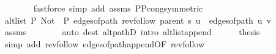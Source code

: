 \begin{isabellebody}
\ \ \ \ \ \ \isamarkupfalse%
\ {\isacharparenleft}{\kern0pt}fastforce\ simp\ add{\isacharcolon}{\kern0pt}\ assms{\isacharparenleft}{\kern0pt}{}{\isacharparenright}{\kern0pt}\ P{\isacharunderscore}{\kern0pt}P{\isacharprime}{\kern0pt}{\isacharprime}{\kern0pt}{\isacharunderscore}{\kern0pt}cong{\isacharbrackleft}{\kern0pt}symmetric{\isacharbrackright}{\kern0pt}{\isacharparenright}{\kern0pt}\isanewline
\ \ \ \ \isamarkupfalse%
\ \isamarkupfalse%
\ {\isachardoublequoteopen}alt{\isacharunderscore}{\kern0pt}list\ P{\isacharprime}{\kern0pt}{\isacharprime}{\kern0pt}\ {\isacharparenleft}{\kern0pt}Not\ {\isasymcirc}\ P{\isacharprime}{\kern0pt}{\isacharprime}{\kern0pt}{\isacharparenright}{\kern0pt}\ {\isacharparenleft}{\kern0pt}edges{\isacharunderscore}{\kern0pt}of{\isacharunderscore}{\kern0pt}path\ {\isacharparenleft}{\kern0pt}rev{\isacharunderscore}{\kern0pt}follow\ {\isacharparenleft}{\kern0pt}parent\ s{\isacharparenright}{\kern0pt}\ u{\isacharparenright}{\kern0pt}\ {\isacharat}{\kern0pt}\ edges{\isacharunderscore}{\kern0pt}of{\isacharunderscore}{\kern0pt}path\ {\isacharbrackleft}{\kern0pt}u{\isacharcomma}{\kern0pt}\ v{\isacharbrackright}{\kern0pt}{\isacharparenright}{\kern0pt}{\isachardoublequoteclose}\isanewline
\ \ \ \ \ \ \isamarkupfalse%
\ assms{\isacharparenleft}{\kern0pt}{}{\isacharparenright}{\kern0pt}\isanewline
\ \ \ \ \ \ \isamarkupfalse%
\ {\isacharparenleft}{\kern0pt}auto\ dest{\isacharcolon}{\kern0pt}\ alt{\isacharunderscore}{\kern0pt}pathD{\isacharparenleft}{\kern0pt}{}{\isacharparenright}{\kern0pt}\ intro{\isacharcolon}{\kern0pt}\ alt{\isacharunderscore}{\kern0pt}list{\isacharunderscore}{\kern0pt}append{\isacharunderscore}{\kern0pt}{}{\isacharprime}{\kern0pt}{\isacharparenright}{\kern0pt}\isanewline
\ \ \ \ \isamarkupfalse%
\ {\isacharquery}{\kern0pt}thesis\isanewline
\ \ \ \ \ \ \isamarkupfalse%
\ {\isacharparenleft}{\kern0pt}simp\ add{\isacharcolon}{\kern0pt}\ rev{\isacharunderscore}{\kern0pt}follow{\isacharparenleft}{\kern0pt}{}{\isacharparenright}{\kern0pt}\ edges{\isacharunderscore}{\kern0pt}of{\isacharunderscore}{\kern0pt}path{\isacharunderscore}{\kern0pt}append{\isacharunderscore}{\kern0pt}{}{\isacharbrackleft}{\kern0pt}OF\ rev{\isacharunderscore}{\kern0pt}follow{\isacharparenleft}{\kern0pt}{}{\isacharparenright}{\kern0pt}{\isacharbrackright}{\kern0pt}{\isacharparenright}{\kern0pt}\isanewline
\ \ \isamarkupfalse%
\isanewline

\end{isabellebody}
